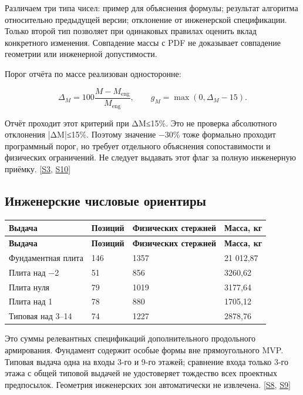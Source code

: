 \documentclass[11pt,a4paper]{article}
\begin{document}
Различаем три типа чисел: пример для объяснения формулы; результат алгоритма относительно предыдущей версии; отклонение от инженерской спецификации. Только второй тип позволяет при одинаковых правилах оценить вклад конкретного изменения. Совпадение массы с PDF не доказывает совпадение геометрии или инженерной допустимости.


Порог отчёта по массе реализован односторонне:


\[
\Delta_M=100\frac{M-M_{\mathrm{eng}}}{M_{\mathrm{eng}}},\qquad
g_M=\max(0,\Delta_M-15).
\]

Отчёт проходит этот критерий при ΔM≤15\%. Это не проверка абсолютного отклонения |ΔM|≤15\%. Поэтому значение −30\% тоже формально проходит программный порог, но требует отдельного объяснения сопоставимости и физических ограничений. Не следует выдавать этот флаг за полную инженерную приёмку. {\color{Teal}\small[\hyperlink{S3}{S3}, \hyperlink{S10}{S10}]}


\subsection{Инженерские числовые ориентиры}

{\small\setlength{\tabcolsep}{4pt}
\begin{longtable}{@{}L{52.892mm}L{35.780mm}L{35.780mm}L{31.113mm}@{}}
\toprule
\textbf{Выдача} & \textbf{Позиций} & \textbf{Физических стержней} & \textbf{Масса, кг} \\
\midrule\endfirsthead
\toprule
\textbf{Выдача} & \textbf{Позиций} & \textbf{Физических стержней} & \textbf{Масса, кг} \\
\midrule\endhead
\bottomrule\endfoot
Фундаментная плита & 146 & 1357 & 21 012,87 \\
Плита над −2 & 51 & 856 & 3260,62 \\
Плита нуля & 79 & 1019 & 3177,64 \\
Плита над 1 & 78 & 880 & 1705,12 \\
Типовая над 3–14 & 74 & 1227 & 2878,76 \\
\end{longtable}}

Это суммы релевантных спецификаций дополнительного продольного армирования. Фундамент содержит особые формы вне прямоугольного MVP. Типовая выдача одна на входы 3-го и 9-го этажей; сравнение входа только 3-го этажа с общей типовой выдачей не удостоверяет тождество всех проектных предпосылок. Геометрия инженерских зон автоматически не извлечена. {\color{Teal}\small[\hyperlink{S8}{S8}, \hyperlink{S9}{S9}]}
\end{document}
